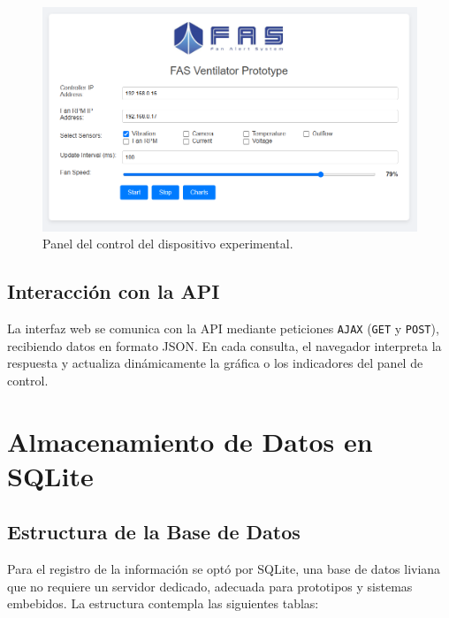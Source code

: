 \begin{figure}[!ht]
    \centering
    \includegraphics[width=0.8\linewidth]{images/web.png}
    \caption{Panel del control del dispositivo experimental.}
    \label{fig:web}
\end{figure}

\subsection{Interacción con la API}
La interfaz web se comunica con la API mediante peticiones \texttt{AJAX} (\texttt{GET} y \texttt{POST}), recibiendo datos en formato JSON. En cada consulta, el navegador interpreta la respuesta y actualiza dinámicamente la gráfica o los indicadores del panel de control.

\section{Almacenamiento de Datos en SQLite}
\subsection{Estructura de la Base de Datos}
Para el registro de la información se optó por SQLite, una base de datos liviana que no requiere un servidor dedicado, adecuada para prototipos y sistemas embebidos. La estructura contempla las siguientes tablas:

